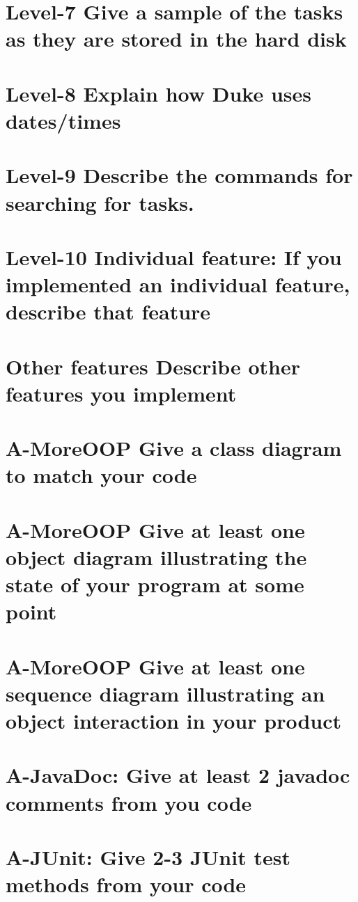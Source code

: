 \documentclass[a4paper,11pt, twoside]{article}
\begin{document}
\begin{table} [htbp]
\section* {Level-7 Give a sample of the tasks as they are stored in the hard disk} 

\section* {Level-8 Explain how Duke uses dates/times} 


\section* {Level-9 Describe the commands for searching for tasks.} 

\section* {Level-10 Individual feature: If you implemented an individual feature, describe that feature} 

\section* {Other features Describe other features you implement} 

\section* {A-MoreOOP Give a class diagram to match your code} 

\section* {A-MoreOOP Give at least one object diagram illustrating the state of your program at some point} 

\section* {A-MoreOOP Give at least one sequence diagram illustrating an object interaction in your product} 

\section* {A-JavaDoc: Give at least 2 javadoc comments from you code} 

\section* {A-JUnit: Give 2-3 JUnit test methods from your code} 


\end{table}
\end{document}

